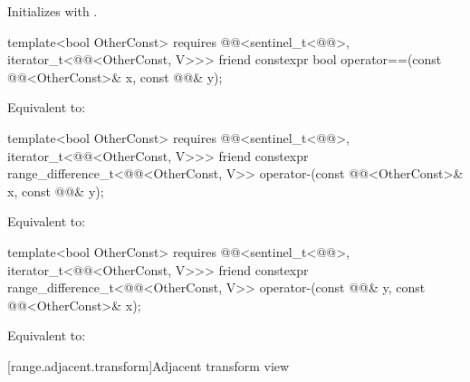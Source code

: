 \begin{itemdescr}
\pnum
\effects
Initializes  with .
\end{itemdescr}

%
\begin{itemdecl}
template<bool OtherConst>
  requires @@<sentinel_t<@@>, iterator_t<@@<OtherConst, V>>>
friend constexpr bool operator==(const @@<OtherConst>& x, const @@& y);
\end{itemdecl}

\begin{itemdescr}
\pnum
\effects
Equivalent to: 
\end{itemdescr}

%
\begin{itemdecl}
template<bool OtherConst>
  requires @@<sentinel_t<@@>, iterator_t<@@<OtherConst, V>>>
friend constexpr range_difference_t<@@<OtherConst, V>>
  operator-(const @@<OtherConst>& x, const @@& y);
\end{itemdecl}

\begin{itemdescr}
\pnum
\effects
Equivalent to: 
\end{itemdescr}

%
\begin{itemdecl}
template<bool OtherConst>
  requires @@<sentinel_t<@@>, iterator_t<@@<OtherConst, V>>>
friend constexpr range_difference_t<@@<OtherConst, V>>
  operator-(const @@& y, const @@<OtherConst>& x);
\end{itemdecl}

\begin{itemdescr}
\pnum
\effects
Equivalent to: 
\end{itemdescr}

[range.adjacent.transform]{Adjacent transform view}

